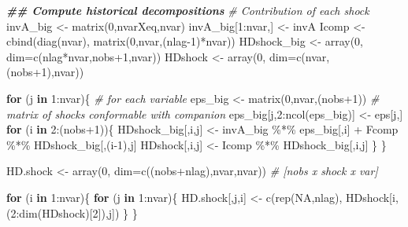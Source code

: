 \documentclass[
]{book}
\newenvironment{Shaded}{\begin{snugshade}}{\end{snugshade}}
\newcommand{\AttributeTok}[1]{\textcolor[rgb]{0.77,0.63,0.00}{#1}}
\newcommand{\CommentTok}[1]{\textcolor[rgb]{0.56,0.35,0.01}{\textit{#1}}}
\newcommand{\ConstantTok}[1]{\textcolor[rgb]{0.00,0.00,0.00}{#1}}
\newcommand{\ControlFlowTok}[1]{\textcolor[rgb]{0.13,0.29,0.53}{\textbf{#1}}}
\newcommand{\DecValTok}[1]{\textcolor[rgb]{0.00,0.00,0.81}{#1}}
\newcommand{\DocumentationTok}[1]{\textcolor[rgb]{0.56,0.35,0.01}{\textbf{\textit{#1}}}}
\newcommand{\FunctionTok}[1]{\textcolor[rgb]{0.00,0.00,0.00}{#1}}
\newcommand{\NormalTok}[1]{#1}
\newcommand{\OtherTok}[1]{\textcolor[rgb]{0.56,0.35,0.01}{#1}}
\newcommand{\SpecialCharTok}[1]{\textcolor[rgb]{0.00,0.00,0.00}{#1}}
\begin{document}
\begin{Shaded}
\begin{Highlighting}[]
  \DocumentationTok{\#\# Compute historical decompositions}
  \CommentTok{\# Contribution of each shock}
\NormalTok{  invA\_big    }\OtherTok{\textless{}{-}} \FunctionTok{matrix}\NormalTok{(}\DecValTok{0}\NormalTok{,nvarXeq,nvar)}
\NormalTok{  invA\_big[}\DecValTok{1}\SpecialCharTok{:}\NormalTok{nvar,] }\OtherTok{\textless{}{-}}\NormalTok{ invA}
\NormalTok{  Icomp       }\OtherTok{\textless{}{-}} \FunctionTok{cbind}\NormalTok{(}\FunctionTok{diag}\NormalTok{(nvar), }\FunctionTok{matrix}\NormalTok{(}\DecValTok{0}\NormalTok{,nvar,(nlag}\DecValTok{{-}1}\NormalTok{)}\SpecialCharTok{*}\NormalTok{nvar))}
\NormalTok{  HDshock\_big }\OtherTok{\textless{}{-}} \FunctionTok{array}\NormalTok{(}\DecValTok{0}\NormalTok{, }\AttributeTok{dim=}\FunctionTok{c}\NormalTok{(nlag}\SpecialCharTok{*}\NormalTok{nvar,nobs}\SpecialCharTok{+}\DecValTok{1}\NormalTok{,nvar))}
\NormalTok{  HDshock     }\OtherTok{\textless{}{-}} \FunctionTok{array}\NormalTok{(}\DecValTok{0}\NormalTok{, }\AttributeTok{dim=}\FunctionTok{c}\NormalTok{(nvar,(nobs}\SpecialCharTok{+}\DecValTok{1}\NormalTok{),nvar))}

  \ControlFlowTok{for}\NormalTok{ (j }\ControlFlowTok{in} \DecValTok{1}\SpecialCharTok{:}\NormalTok{nvar)\{  }\CommentTok{\# for each variable}
\NormalTok{    eps\_big }\OtherTok{\textless{}{-}} \FunctionTok{matrix}\NormalTok{(}\DecValTok{0}\NormalTok{,nvar,(nobs}\SpecialCharTok{+}\DecValTok{1}\NormalTok{)) }\CommentTok{\# matrix of shocks conformable with companion}
\NormalTok{    eps\_big[j,}\DecValTok{2}\SpecialCharTok{:}\FunctionTok{ncol}\NormalTok{(eps\_big)] }\OtherTok{\textless{}{-}}\NormalTok{ eps[j,]}
    \ControlFlowTok{for}\NormalTok{ (i }\ControlFlowTok{in} \DecValTok{2}\SpecialCharTok{:}\NormalTok{(nobs}\SpecialCharTok{+}\DecValTok{1}\NormalTok{))\{}
\NormalTok{      HDshock\_big[,i,j] }\OtherTok{\textless{}{-}}\NormalTok{ invA\_big }\SpecialCharTok{\%*\%}\NormalTok{ eps\_big[,i] }\SpecialCharTok{+}\NormalTok{ Fcomp }\SpecialCharTok{\%*\%}\NormalTok{ HDshock\_big[,(i}\DecValTok{{-}1}\NormalTok{),j]}
\NormalTok{      HDshock[,i,j] }\OtherTok{\textless{}{-}}\NormalTok{  Icomp }\SpecialCharTok{\%*\%}\NormalTok{ HDshock\_big[,i,j]}
\NormalTok{    \}}
\NormalTok{  \}}

\NormalTok{  HD.shock }\OtherTok{\textless{}{-}} \FunctionTok{array}\NormalTok{(}\DecValTok{0}\NormalTok{, }\AttributeTok{dim=}\FunctionTok{c}\NormalTok{((nobs}\SpecialCharTok{+}\NormalTok{nlag),nvar,nvar))   }\CommentTok{\# [nobs x shock x var]}

  \ControlFlowTok{for}\NormalTok{ (i }\ControlFlowTok{in} \DecValTok{1}\SpecialCharTok{:}\NormalTok{nvar)\{}
    \ControlFlowTok{for}\NormalTok{ (j }\ControlFlowTok{in} \DecValTok{1}\SpecialCharTok{:}\NormalTok{nvar)\{}
\NormalTok{      HD.shock[,j,i] }\OtherTok{\textless{}{-}} \FunctionTok{c}\NormalTok{(}\FunctionTok{rep}\NormalTok{(}\ConstantTok{NA}\NormalTok{,nlag), HDshock[i,(}\DecValTok{2}\SpecialCharTok{:}\FunctionTok{dim}\NormalTok{(HDshock)[}\DecValTok{2}\NormalTok{]),j])}
\NormalTok{    \}}
\NormalTok{  \}}


\end{Highlighting}
\end{Shaded}
\end{document}
